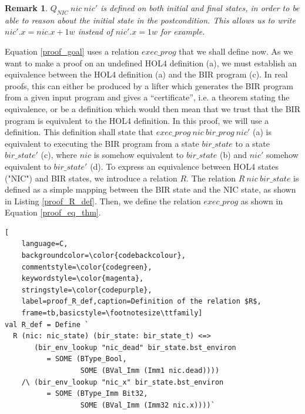 \documentclass{kththesis}
\newtheorem{remark}{Remark}
\begin{document}
{\begin{remark} \label{remark_Q_nic_intial_final}
$Q_{NIC}~nic~nic'$ is defined on both initial and final states, in order to be able to reason about the initial state in the postcondition. This allows us to write $nic'.x = nic.x + 1w$ instead of $nic'.x = 1w$ for example.
\end{remark}

Equation \ref{proof_goal} uses a relation $exec\_prog$ that we shall define now. As we want to make a proof on an undefined HOL4 definition (a), we must establish an equivalence between the HOL4 definition (a) and the BIR program (c). In real proofs, this can either be produced by a lifter which generates the BIR program from a given input program and gives a ``certificate'', i.e. a theorem stating the equivalence, or be a definition which would then mean that we trust that the BIR program is equivalent to the HOL4 definition. In this proof, we will use a definition. This definition shall state that $exec\_prog~nic~bir\_prog~nic'$ (a) is equivalent to executing the BIR program from a state $bir\_state$ to a state $bir\_state'$ (c), where $nic$ is somehow equivalent to $bir\_state$ (b) and $nic'$ somehow equivalent to $bir\_state'$ (d). To express an equivalence between HOL4 states ("NIC") and BIR states, we introduce a relation $R$. The relation $R~nic~bir\_state$ is defined as a simple mapping between the BIR state and the NIC state, as shown in Listing \ref{proof_R_def}. Then, we define the relation $exec\_prog$ as shown in Equation \ref{proof_eq_thm}\footnotemark.


\begin{lstlisting}[
    language=C,
    backgroundcolor=\color{codebackcolour},
    commentstyle=\color{codegreen},
    keywordstyle=\color{magenta},
    stringstyle=\color{codepurple},
    label=proof_R_def,caption=Definition of the relation $R$,
    frame=tb,basicstyle=\footnotesize\ttfamily]
val R_def = Define `
  R (nic: nic_state) (bir_state: bir_state_t) <=>
       (bir_env_lookup "nic_dead" bir_state.bst_environ
          = SOME (BType_Bool,
                  SOME (BVal_Imm (Imm1 nic.dead))))
    /\ (bir_env_lookup "nic_x" bir_state.bst_environ
          = SOME (BType_Imm Bit32,
                  SOME (BVal_Imm (Imm32 nic.x))))`
\end{lstlisting}

}
\end{document}
